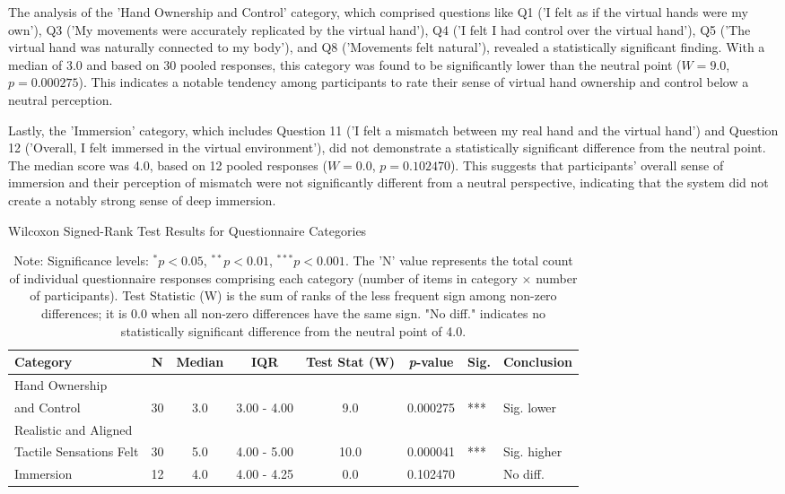 The analysis of the 'Hand Ownership and Control' category, which comprised questions like Q1 ('I felt as if the virtual hands were my own'), Q3 ('My movements were accurately replicated by the virtual hand'), Q4 ('I felt I had control over the virtual hand'), Q5 ('The virtual hand was naturally connected to my body'), and Q8 ('Movements felt natural'), revealed a statistically significant finding. With a median of 3.0 and based on 30 pooled responses, this category was found to be significantly lower than the neutral point ($W=9.0$, $p=0.000275$). This indicates a notable tendency among participants to rate their sense of virtual hand ownership and control below a neutral perception.

Lastly, the 'Immersion' category, which includes Question 11 ('I felt a mismatch between my real hand and the virtual hand') and Question 12 ('Overall, I felt immersed in the virtual environment'), did not demonstrate a statistically significant difference from the neutral point. The median score was 4.0, based on 12 pooled responses ($W=0.0$,  $p=0.102470$). This suggests that participants' overall sense of immersion and their perception of mismatch were not significantly different from a neutral perspective, indicating that the system did not create a notably strong sense of deep immersion.

\begin{table}[H]
    \centering
    \caption{Wilcoxon Signed-Rank Test Results for Questionnaire Categories}
    \label{tab:wilcoxon_category_results}
    \begin{tabular}{@{} p{2.5cm} c c c c S[table-format=1.6] l p{1.5cm} @{}}
        \toprule
        \textbf{Category} & \textbf{N} & \textbf{Median} & \textbf{IQR} & \textbf{Test Stat (W)} & \textbf{\textit{p}-value} & \textbf{Sig.} & \textbf{Conclusion} \\
        \midrule
        Hand Ownership \\ and Control & 30 & 3.0 & 3.00 - 4.00 & 9.0 & 0.000275 & *** & Sig. lower  \\
        \midrule
        Realistic and Aligned \\ Tactile Sensations Felt & 30 & 5.0 & 4.00 - 5.00 & 10.0 & 0.000041 & *** & Sig. higher  \\
        \midrule
        Immersion & 12 & 4.0 & 4.00 - 4.25 & 0.0 & 0.102470 & & No diff. \\
        \bottomrule
    \end{tabular}
    \caption*{Note: Significance levels: $^* p < 0.05$, $^{**} p < 0.01$, $^{***} p < 0.001$. The 'N' value represents the total count of individual questionnaire responses comprising each category (number of items in category $\times$ number of participants). Test Statistic (W) is the sum of ranks of the less frequent sign among non-zero differences; it is 0.0 when all non-zero differences have the same sign. "No diff." indicates no statistically significant difference from the neutral point of 4.0.}
\end{table}

